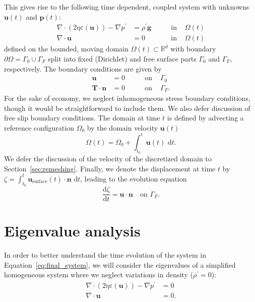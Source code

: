 \documentclass[preprint,12pt,authoryear]{elsarticle}
\begin{document}
This gives rise to the following time dependent, coupled system with unknowns $\mathbf{u}(t)$ and $\mathbf{p}(t)$:
\begin{equation}
\begin{aligned}
\nabla \cdot \left( 2 \eta \varepsilon( \mathbf{u} ) \right) - \nabla p^\prime &= \rho^\prime \mathbf{g} \qquad &\text{in } &\Omega(t)\\
\nabla \cdot \mathbf{u} &= 0  \qquad &\text{in } &\Omega(t)
\end{aligned}
\label{eq:final_system}
\end{equation}
defined on the bounded, moving domain $\Omega(t)\subset \mathbb{R}^d$ with boundary $\partial \Omega = \Gamma_0 \cup \Gamma_F$
split into fixed (Dirichlet) and free surface parts $\Gamma_0$ and $\Gamma_F$, respectively.
The boundary conditions are given by
\begin{equation}
\begin{aligned}
\mathbf{u} &= 0 &\qquad \text{on } &\Gamma_0 \\
\mathbf{T}\cdot \mathbf{n} &= 0 &\qquad \text{on } &\Gamma_F.
\end{aligned}
\end{equation}
For the sake of economy, we neglect inhomogeneous stress boundary conditions, though it would be straightforward to include them.
We also defer discussion of free slip boundary conditions.
The domain at time $t$ is defined by advecting a reference configuration $\Omega_0$ by the domain velocity $\mathbf{u}(t)$
\begin{equation}
 \Omega(t) = \Omega_0 + \int_{t_0}^t \mathbf{u}(t) \text{ d}t.
 \label{eq:domain_evolution}
\end{equation}
We defer the discussion of the velocity of the discretized domain to Section~\ref{sec:remeshing}.
Finally, we denote the displacement at time $t$ by $\zeta = \int_{t_0}^t \mathbf{u}_\mathrm{surface}(t)\cdot \mathbf{n} \text{ d}t$, leading to the evolution
equation
\begin{equation}
\frac{\text{d} \zeta}{\text{d}t} = \mathbf{u \cdot \mathbf{n}} \quad \textrm{on  }  \Gamma_F.
\label{eq:surface_evolution}
\end{equation}



\section{Eigenvalue analysis}
\label{sec:eigenvalue}

In order to better understand the time evolution of the system in Equation~\eqref{eq:final_system},
we will consider the eigenvalues of a simplified homogeneous system where we neglect variations in density ($\rho^\prime = 0$):
\begin{equation}
\begin{aligned}
\nabla \cdot \left( 2 \eta \varepsilon( \mathbf{u} ) \right) - \nabla p^\prime &= 0 \\
\nabla \cdot \mathbf{u} &= 0.
\end{aligned}
\label{eq:homogeneous_stokes}
\end{equation}
\end{document}
